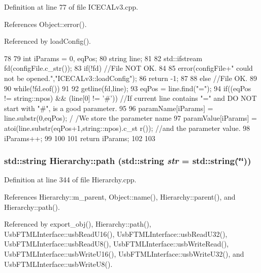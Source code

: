 Definition at line 77 of file ICECALv3.cpp.

References Object::error().

Referenced by loadConfig().


\begin{DoxyCode}
78 {
79     int iParams = 0, eqPos;
80     string line;    
81 
82     std::ifstream fd(configFile.c_str());
83     if(!fd)                                 //File NOT OK.
84     {
85         error(configFile+" could not be opened.","ICECALv3::loadConfig");
86         return -1;
87   }
88     else                                        //File OK.
89     {
90         while(!fd.eof())                                    
91         {
92             getline(fd,line);
93             eqPos = line.find("=");
94             if((eqPos != string::npos) && (line[0] != '#'))     //If current line
       contains "=" and DO NOT start with "#", is a good parameter.
95             {
96                 paramName[iParams]  = line.substr(0,eqPos);                                                         /
      /We store the parameter name
97                 paramValue[iParams] = atoi(line.substr(eqPos+1,string::npos).c_st
      r());   //and the parameter value.
98                 iParams++;
99             }
100         }
101         return iParams;
102     }
103 }
\end{DoxyCode}
\hypertarget{classHierarchy_aa7990fa7caf132d83e361ce033c6c65a}{
\subsubsection[{path}]{\setlength{\rightskip}{0pt plus 5cm}std::string Hierarchy::path (std::string {\em str} = {\ttfamily std::string(\char`\"{}\char`\"{})})}}
\label{classHierarchy_aa7990fa7caf132d83e361ce033c6c65a}


Definition at line 344 of file Hierarchy.cpp.

References Hierarchy::m\_\-parent, Object::name(), Hierarchy::parent(), and Hierarchy::path().

Referenced by export\_\-obj(), Hierarchy::path(), UsbFTMLInterface::usbReadU16(), UsbFTMLInterface::usbReadU32(), UsbFTMLInterface::usbReadU8(), UsbFTMLInterface::usbWriteRead(), UsbFTMLInterface::usbWriteU16(), UsbFTMLInterface::usbWriteU32(), and UsbFTMLInterface::usbWriteU8().


